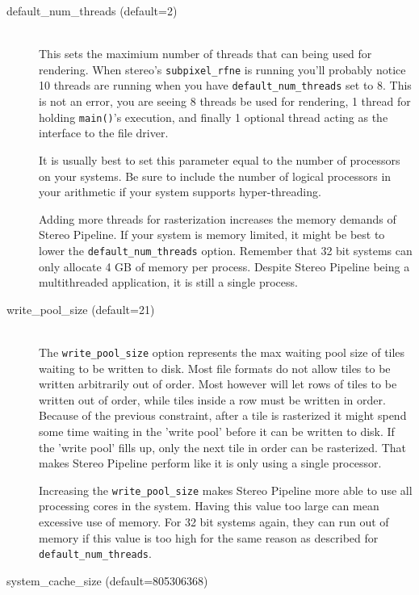 \pagebreak
\begin{description}

\item[default\_num\_threads \textnormal (default=2)] \hfill \\

This sets the maximium number of threads that can being used for
rendering. When stereo's \texttt{subpixel\_rfne} is running you'll
probably notice 10 threads are running when you have
\texttt{default\_num\_threads} set to 8. This is not an error, you are
seeing 8 threads be used for rendering, 1 thread for holding
\texttt{main()}'s execution, and finally 1 optional thread acting as the
interface to the file driver.

It is usually best to set this parameter equal to the number of
processors on your systems. Be sure to include the number of logical
processors in your arithmetic if your system supports hyper-threading.

Adding more threads for rasterization increases the memory demands of
Stereo Pipeline. If your system is memory limited, it might be best to
lower the \texttt{default\_num\_threads} option. Remember that 32 bit
systems can only allocate 4 GB of memory per process. Despite Stereo
Pipeline being a multithreaded application, it is still a single
process.

\item[write\_pool\_size \textnormal (default=21)] \hfill \\

The \texttt{write\_pool\_size} option represents the max waiting pool
size of tiles waiting to be written to disk. Most file formats do not
allow tiles to be written arbitrarily out of order. Most however will
let rows of tiles to be written out of order, while tiles inside a row
must be written in order. Because of the previous constraint, after a
tile is rasterized it might spend  some time waiting in the 'write
pool' before it can be written to disk. If the 'write pool' fills up,
only the next tile in order can be rasterized. That makes Stereo
Pipeline perform like it is only using a single processor.

Increasing the \texttt{write\_pool\_size} makes Stereo Pipeline more
able to use all processing cores in the system. Having this value too
large can mean excessive use of memory. For 32 bit systems again, they
can run out of memory if this value is too high for the same reason as
described for \texttt{default\_num\_threads}.

\item[system\_cache\_size \textnormal (default=805306368)] \hfill \\


\end{description}
